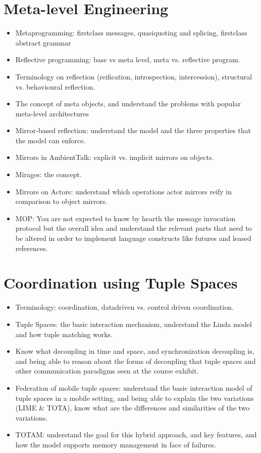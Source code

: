 \documentclass[a4paper]{report}
\begin{document}
\chapter{Meta-level Engineering}
\begin{itemize}
\item Metaprogramming: firstclass messages, quasiquoting and splicing, firstclass abstract
grammar
\item Reflective programming: base vs meta level, meta vs. reflective program.
\item Terminology on reflection (reification, introspection, intercession), structural vs.
behavioural reflection.
\item The concept of meta objects, and understand the problems with popular meta-level
architectures
\item Mirror-based reflection: understand the model and the three properties that the model
can enforce.
\item Mirrors in AmbientTalk: explicit vs. implicit mirrors on objects.
\item Mirages: the concept.
\item Mirrors on Actors: understand which operations actor mirrors reify in comparison to
object mirrors.
\item MOP: You are not expected to know by hearth the message invocation protocol but
the overall idea and understand the relevant parts that need to be altered in order to
implement language constructs like futures and leased references.
\end{itemize}
\chapter{Coordination using Tuple Spaces}
\begin{itemize}
\item Terminology: coordination, datadriven vs. control driven coordination.
\item Tuple Spaces: the basic interaction mechanism, understand the Linda model and how tuple matching works.
\item Know what decoupling in time and space, and synchronization decoupling is, and being able to reason about the forms of decoupling that tuple spaces and other communication paradigms seen at the course exhibit.
\item Federation of mobile tuple spaces: understand the basic interaction model of tuple spaces in a mobile setting, and being able to explain the two variations (LIME \& TOTA), know what are the differences and similarities of the two variations.
\item TOTAM: understand the goal for this hybrid approach, and key features, and how the model supports memory management in face of failures.
\end{itemize}
\end{document}
